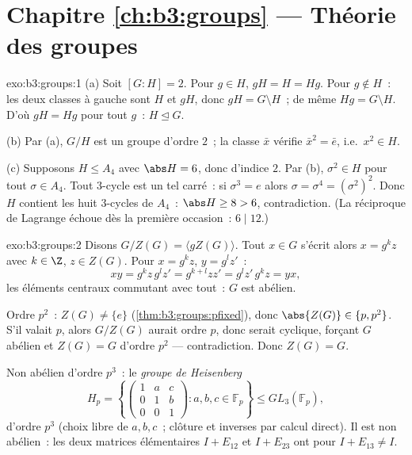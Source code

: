 \section*{Chapitre \ref{ch:b3:groups} --- Théorie des groupes}

\begin{solution}{exo:b3:groups:1}
(a) Soit $[G:H] = 2$. Pour $g \in H$, $gH = H = Hg$. Pour $g
\notin H$~: les deux classes à gauche sont $H$ et $gH$, donc $gH
= G \setminus H$~; de même $Hg = G \setminus H$. D'où $gH = Hg$
pour tout $g$~: $H \trianglelefteq G$.

(b) Par (a), $G/H$ est un groupe d'ordre $2$~; la classe $\bar x$
vérifie $\bar x^2 = \bar e$, i.e.\ $x^2 \in H$.

(c) Supposons $H \leq A_4$ avec $\abs H = 6$, donc d'indice $2$.
Par (b), $\sigma^2 \in H$ pour tout $\sigma \in A_4$. Tout
$3$-cycle est un tel carré~: si $\sigma^3 = e$ alors $\sigma =
\sigma^4 = (\sigma^2)^2$. Donc $H$ contient les huit $3$-cycles
de $A_4$~: $\abs H \geq 8 > 6$, contradiction. (La réciproque de
Lagrange échoue dès la première occasion~: $6 \mid 12$.)
\end{solution}

\begin{solution}{exo:b3:groups:2}
Disons $G/Z(G) = \langle gZ(G) \rangle$. Tout $x \in G$ s'écrit
alors $x = g^k z$ avec $k \in \Z$, $z \in Z(G)$. Pour $x =
g^kz$, $y = g^l z'$~:
\[
xy = g^k z\, g^l z' = g^{k+l} z z' = g^l z'\, g^k z = yx,
\]
les éléments centraux commutant avec tout~: $G$ est abélien.

Ordre $p^2$~: $Z(G) \neq \{e\}$ (\cref{thm:b3:groups:pfixed}),
donc $\abs{Z(G)} \in \{p, p^2\}$. S'il valait $p$, alors $G/Z(G)$
aurait ordre $p$, donc serait cyclique, forçant $G$ abélien et
$Z(G) = G$ d'ordre $p^2$ --- contradiction. Donc $Z(G) = G$.

Non abélien d'ordre $p^3$~: le \emph{groupe de Heisenberg}
\[
H_p = \left\{ \begin{pmatrix} 1 & a & c\\ 0 & 1 & b\\ 0 & 0 & 1
\end{pmatrix} : a, b, c \in \mathbb F_p \right\}
\leq GL_3(\mathbb F_p),
\]
d'ordre $p^3$ (choix libre de $a, b, c$~; clôture et inverses par
calcul direct). Il est non abélien~: les deux matrices
élémentaires $I + E_{12}$ et $I + E_{23}$ ont pour  $I
+ E_{13} \neq I$.
\end{solution}

